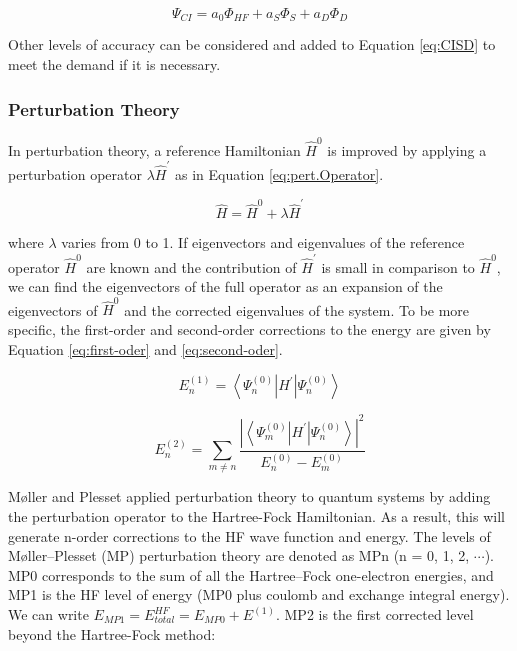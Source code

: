 \begin{refsection}
\begin{equation}
\Psi_{CI} = a_{0}\Phi_{HF} + a_S\Phi_{S} + a_D\Phi_{D}
\label{eq:CISD}
\end{equation}

\noindent Other levels of accuracy can be considered and added to Equation \ref{eq:CISD} to meet the demand if it is necessary.

\subsubsection{Perturbation Theory} \label{section:Perturbation}

In perturbation theory, a reference Hamiltonian $\widehat{H}^0$ is improved by applying a perturbation operator $\lambda\widehat{H}^\prime$ as in Equation \ref{eq:pert.Operator}.


\begin{equation}
\widehat{H} = \widehat{H}^0+ \lambda\widehat{H}^\prime
\label{eq:pert.Operator}
\end{equation}

\noindent where $\lambda$  varies from 0 to 1. If eigenvectors and eigenvalues of the reference operator $\widehat{H}^0$ are known and the contribution of $\widehat{H}^\prime$ is small in comparison to $\widehat{H}^0$, we can find the eigenvectors of the full operator as an expansion of the eigenvectors of $\widehat{H}^0$ and the corrected eigenvalues of the system. To be more specific, the first-order and second-order corrections to the energy are given by Equation \ref{eq:first-oder} and \ref{eq:second-oder}.

\begin{equation}
E^{(1)}_n = \left\langle\Psi^{(0)}_n\left|H^\prime\right|\Psi^{(0)}_n\right\rangle
\label{eq:first-oder}
\end{equation}


\begin{equation}
E^{(2)}_n = \sum_{m\neq n}\frac{\left|\left\langle\Psi^{(0)}_m\left\lvert H^\prime \right\rvert\Psi^{(0)}_n\right\rangle\right|^2}{E^{(0)}_n - E^{(0)}_m}
\label{eq:second-oder}
\end{equation}

\noindent M\o{}ller and Plesset applied perturbation theory to quantum systems by adding the perturbation operator to the Hartree-Fock Hamiltonian.\cite{c1:moller1934}  As a result, this will generate n-order corrections to the HF wave function and energy. The levels of M\o{}ller–Plesset (MP) perturbation theory are denoted as MPn (n = 0, 1, 2, $\cdots$). MP0 corresponds to the sum of all the Hartree–Fock one-electron energies, and MP1 is the HF level of energy (MP0 plus coulomb and exchange integral energy). We can write $E_{MP1} = E^{HF}_{total} = E_{MP0} + E^{(1)}$. MP2 is the first corrected level beyond the Hartree-Fock method:


\end{refsection}
